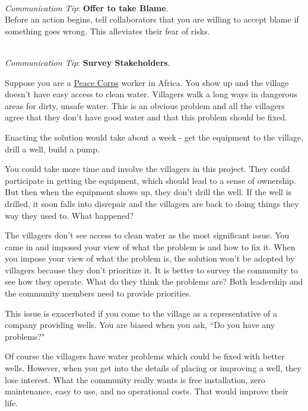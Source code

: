 \ \\
\textit{Communication Tip}: \textbf{Offer to take Blame\label{sec:take-blame}}.\\
Before an action begins, tell collaborators that you are willing to accept blame if something goes wrong. This alleviates their fear of risks.

\ \\
\textit{Communication Tip}: \textbf{Survey Stakeholders}.\\

\begin{mdframed}[frametitle={Building a Well in a Village},frametitlerule=true,frametitlealignment=\centering]
Suppose you are a \href{http://www.peacecorps.gov/}{Peace Corps} worker in Africa. 
You show up and the village doesn't have easy access to clean water. Villagers walk a long ways in dangerous areas for dirty, unsafe water. This is an obvious problem and all the villagers agree that they don't have good water and that this problem should be fixed.

Enacting the solution would take about a week - get the equipment to the village, drill a well, build a pump.

You could take more time and involve the villagers in this project. They could participate in getting the equipment, which should lead to a sense of ownership.
But then when the equipment shows up, they don't drill the well. If the well is drilled, it soon falls into disrepair and the villagers are back to doing things they way they used to. What happened?

The villagers don't see access to clean water as the most significant issue. You came in and imposed your view of what the problem is and how to fix it. When you impose your view of what the problem is, the solution won't be adopted by villagers because they don't prioritize it.
It is better to survey the community to see how they operate. What do they think the problems are?
Both leadership and the community members need to provide priorities.

This issue is exacerbated if you come to the village as a representative of a company providing wells. You are biased when you ask, ``Do you have any problems?"

Of course the villagers have water problems which could be fixed with better wells. However, when you get into the details of placing or improving a well, they lose interest. What the community really wants is free installation, zero maintenance, easy to use, and no operational costs. That would improve their life.
\end{mdframed}

